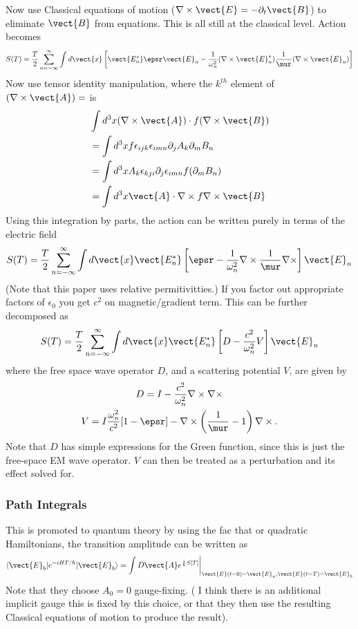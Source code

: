Now use Classical equations of motion ($\nabla\times\vect{E}=-\partial_t\vect{B}$)
to eliminate $\vect{B}$ from equations.  This is all still at the classical level.
Action becomes
\begin{align}
S(T) = \frac{T}{2}\sum_{n=-\infty}^\infty \int d\vect{x}
\left[\vect{E_n^*}\epsr\vect{E}_n-\frac{1}{\omega_n^2}
(\nabla\times\vect{E}_n^*)\frac{1}{\mur}(\nabla\times\vect{E}_n)\right]
\end{align}
Now use tensor identity manipulation, where the $k^{th}$ element of $(\nabla\times\vect{A})=$ is
\begin{align}
&\int d^3x (\nabla\times\vect{A}) \cdot f(\nabla\times\vect{B})\\
&=\int d^3x f\epsilon_{ijk}\epsilon_{imn}\partial_jA_k\partial_mB_n\\
&=\int d^3x A_k \epsilon_{kji}\partial_j\epsilon_{imn} f(\partial_mB_n)\\
&=\int d^3x \vect{A}\cdot\nabla\times f \nabla\times\vect{B}
\end{align}
Using this integration by parts, the action can be written purely in terms of the electric field
\begin{align}
S(T) = \frac{T}{2}\sum_{n=-\infty}^\infty \int d\vect{x}\vect{E_n^*}
\left[\epsr-\frac{1}{\omega_n^2}\nabla\times\frac{1}{\mur}\nabla\times\right]\vect{E}_n
\end{align}
(Note that this paper uses relative permitivitties.) If you factor out appropriate factors of $\epsilon_0$
you get $c^2$ on magnetic/gradient term.  
This can be further decomposed as
\begin{align}
S(T) = \frac{T}{2}\sum_{n=-\infty}^\infty \int d\vect{x}\vect{E_n^*}
\left[D -\frac{c^2}{\omega_n^2}V\right]\vect{E}_n
\end{align}
where the free space wave operator $D$, and a scattering potential $V$, are given by
\begin{gather}
D=I-\frac{c^2}{\omega_n^2}\nabla\times\nabla\times\\
V=I\frac{\omega_n^2}{c^2}[1-\epsr]-\nabla\times\left(\frac{1}{\mur}-1\right)\nabla\times.
\end{gather}
Note that $D$ has simple expressions for the Green function, since this is just the free-space
EM wave operator.  $V$ can then be treated as a perturbation and its effect solved for.

\subsubsection{Path Integrals}
This is promoted to quantum theory by using the fac that or quadratic Hamiltonians, 
the transition amplitude can be written as 
\begin{equation}
\langle \vect{E}_b|e^{-iHT/\hbar}|\vect{E}_b\rangle = \int D\vect{A} e^{\frac{i}{\hbar}S[T]}
\bigg|_{\vect{E}(t=0)=\vect{E}_a,\vect{E}(t=T)=\vect{E}_b}
\end{equation}
Note that they choose $A_0=0$ gauge-fixing.  ( I think there is an additional implicit
gauge this is fixed by this choice, or that they then use the resulting Classical equations
of motion to produce the result).  

